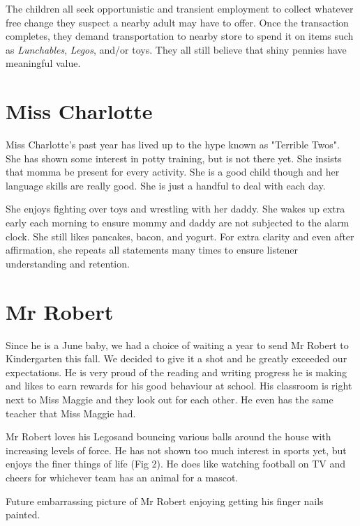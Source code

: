 \documentclass[letterpaper,11pt]{article}
\makeatletter
\newenvironment{figurehere}
  {\def\@captype{figure}}
  {}
\makeatother
\begin{document}
\begin{multicols}{2}
The children all seek opportunistic and transient employment to collect whatever
free change they suspect a nearby adult may have to offer.  Once the transaction
completes, they demand transportation to nearby store to spend it on items such
as \textit{Lunchables}, \textit{Legos\texttrademark}, and/or toys.  They all
still believe that shiny pennies have meaningful value.

\section{Miss Charlotte}

Miss Charlotte's past year has lived up to the hype known as "Terrible Twos". She
has shown some interest in potty training, but is not there yet.  She insists that
momma be present for every activity.  She is a good child though and her language
skills are really good.  She is just a handful to deal with each day.

She enjoys fighting over toys and wrestling with her daddy. She wakes up extra
early each morning to ensure mommy and daddy are not subjected to the alarm clock.
She still likes pancakes, bacon, and yogurt.  For extra clarity and even after
affirmation, she repeats all statements many times to ensure listener understanding
and retention.

\section{Mr Robert}

Since he is a June baby, we had a choice of waiting a year to send Mr Robert to
Kindergarten this fall.  We decided to give it a shot and he greatly exceeded
our expectations.  He is very proud of the reading and writing progress he is
making and likes to earn rewards for his good behaviour at school.  His classroom
is right next to Miss Maggie and they look out for each other.  He even has the
same teacher that Miss Maggie had.

Mr Robert loves his Legos\texttrademark and bouncing various balls around the house with 
increasing levels of force.  He has not shown too much interest in sports yet,
but enjoys the finer things of life (Fig 2).  He does like watching football on TV and
cheers for whichever team has an animal for a mascot.

\bigskip

\begin{figurehere}
 \centering   
 \caption{Future embarrassing picture of Mr Robert enjoying getting his finger nails painted.}
\end{figurehere}


\end{multicols}
\end{document}
